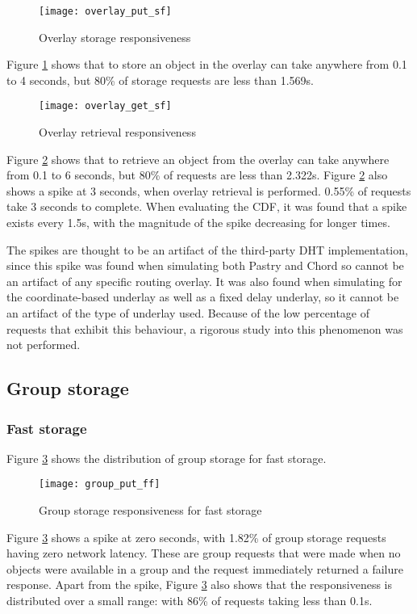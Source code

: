 \begin{figure}[htbp]
 \centering
 \texttt{[image: overlay\_put\_sf]}
 \caption{Overlay storage responsiveness}
 \label{fig_overlay_put_sf}
\end{figure}
%
Figure \ref{fig_overlay_put_sf} shows that to store an object in the overlay can take anywhere from 0.1 to 4 seconds, but 80\% of storage requests are less than 1.569s.

\begin{figure}[htbp]
 \centering
 \texttt{[image: overlay\_get\_sf]}
 \caption{Overlay retrieval responsiveness}
 \label{fig_overlay_get_sf}
\end{figure}
%
Figure \ref{fig_overlay_get_sf} shows that to retrieve an object from the overlay can take anywhere from 0.1 to 6 seconds, but 80\% of requests are less than 2.322s. Figure \ref{fig_overlay_get_sf} also shows a spike at 3 seconds, when overlay retrieval is performed. 0.55\% of requests take 3 seconds to complete. When evaluating the CDF, it was found that a spike exists every 1.5s, with the magnitude of the spike decreasing for longer times.

The spikes are thought to be an artifact of the third-party DHT implementation, since this spike was found when simulating both Pastry and Chord so cannot be an artifact of any specific routing overlay. It was also found when simulating for the coordinate-based underlay as well as a fixed delay underlay, so it cannot be an artifact of the type of underlay used. Because of the low percentage of requests that exhibit this behaviour, a rigorous study into this phenomenon was not performed.

\subsection{Group storage}
\label{group_storage_eval}

\subsubsection{Fast storage}
\label{group_put_f_fp}

Figure \ref{fig_group_put_ff} shows the distribution of group storage for fast storage.

\begin{figure}[htbp]
 \centering
 \texttt{[image: group\_put\_ff]}
 \caption{Group storage responsiveness for fast storage}
 \label{fig_group_put_ff}
\end{figure}
%
Figure \ref{fig_group_put_ff} shows a spike at zero seconds, with 1.82\% of group storage requests having zero network latency. These are group requests that were made when no objects were available in a group and the request immediately returned a failure response. Apart from the spike, Figure \ref{fig_group_put_ff} also shows that the responsiveness is distributed over a small range: with 86\% of requests taking less than 0.1s.

